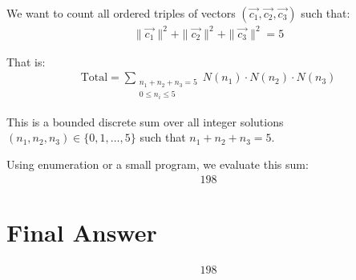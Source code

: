 \documentclass[journal]{IEEEtran}
\begin{document}
We want to count all ordered triples of vectors \( (\vec{c_1}, \vec{c_2}, \vec{c_3}) \) such that:
\begin{align}
\|\vec{c_1}\|^2 + \|\vec{c_2}\|^2 + \|\vec{c_3}\|^2 = 5
\end{align}

That is:
\begin{align}
\text{Total} = \sum_{\substack{n_1 + n_2 + n_3 = 5 \\ 0 \leq n_i \leq 5}} N(n_1) \cdot N(n_2) \cdot N(n_3)
\end{align}

This is a bounded discrete sum over all integer solutions \( (n_1, n_2, n_3) \in \{0,1,\dots,5\} \) such that \( n_1 + n_2 + n_3 = 5 \).

Using enumeration or a small program, we evaluate this sum:
\begin{align}
\boxed{198}
\end{align}

\section*{Final Answer}

\begin{align}
\boxed{198}
\end{align}
\end{document}
